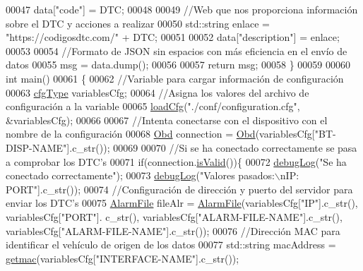 \begin{DoxyCode}
00047     data[\textcolor{stringliteral}{"code"}] = DTC;
00048 
00049     \textcolor{comment}{//Web que nos proporciona información sobre el DTC y acciones a realizar}
00050     std::string enlace = \textcolor{stringliteral}{"https://codigosdtc.com/"} + DTC;
00051 
00052     data[\textcolor{stringliteral}{"description"}] = enlace;
00053 
00054     \textcolor{comment}{//Formato de JSON sin espacios con más eficiencia en el envío de datos}
00055     msg = data.dump();
00056 
00057     \textcolor{keywordflow}{return} msg;
00058 \}
00059 
00060 \textcolor{keywordtype}{int} main()
00061 \{
00062     \textcolor{comment}{//Variable para cargar información de configuración}
00063     \hyperlink{loadcfg_8hpp_a3bc0e674227412446fc364a733cebde6}{cfgType} variablesCfg;
00064     \textcolor{comment}{//Asigna los valores del archivo de configuración a la variable}
00065     \hyperlink{loadcfg_8cpp_a4667fdb45ba6b04ab678f894e58a2fcb}{loadCfg}(\textcolor{stringliteral}{"./conf/configuration.cfg"}, &variablesCfg);
00066 
00067     \textcolor{comment}{//Intenta conectarse con el dispositivo con el nombre de la configuración}
00068     \hyperlink{classObd}{Obd} connection = \hyperlink{classObd}{Obd}(variablesCfg[\textcolor{stringliteral}{"BT-DISP-NAME"}].c\_str());
00069 
00070     \textcolor{comment}{//Si se ha conectado correctamente se pasa a comprobar los DTC's}
00071     \textcolor{keywordflow}{if}(connection.\hyperlink{classObd_ae28b765bb787467f929eae932133d2aa}{isValid}())\{
00072         \hyperlink{debug_8hpp_a55f41cf7b0585224496de3d7adbc101c}{debugLog}(\textcolor{stringliteral}{"Se ha conectado correctamente"});
00073         \hyperlink{debug_8hpp_a55f41cf7b0585224496de3d7adbc101c}{debugLog}(\textcolor{stringliteral}{"Valores pasados:\(\backslash\)nIP: %
      PORT"}].c\_str());
00074         \textcolor{comment}{//Configuración de dirección y puerto del servidor para enviar los DTC's}
00075         \hyperlink{classAlarmFile}{AlarmFile} fileAlr = \hyperlink{classAlarmFile}{AlarmFile}(variablesCfg[\textcolor{stringliteral}{"IP"}].c\_str(), variablesCfg[\textcolor{stringliteral}{"PORT"}].
      c\_str(), variablesCfg[\textcolor{stringliteral}{"ALARM-FILE-NAME"}].c\_str(), variablesCfg[\textcolor{stringliteral}{"ALARM-FILE-NAME"}].c\_str());
00076         \textcolor{comment}{//Dirección MAC para identificar el vehículo de origen de los datos}
00077         std::string macAddress = \hyperlink{loadcfg_8cpp_ae4db05d33445e6b6ca0c4a6a0ba23bf3}{getmac}(variablesCfg[\textcolor{stringliteral}{"INTERFACE-NAME"}].c\_str());

\end{DoxyCode}
